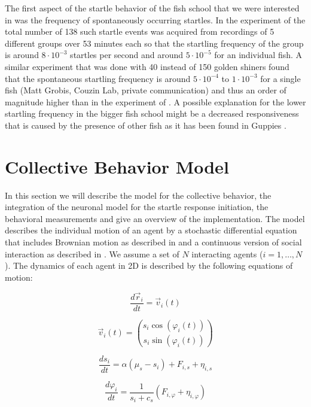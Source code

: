     The first aspect of the startle behavior of the fish school that we were interested in was the frequency of spontaneously occurring startles.
    In the experiment of \cite{Rosenthal2015} the total number of 138 such startle events was acquired from recordings of 5 different groups over 53 minutes each so that the startling frequency of the group is around $8\cdot 10^{-3}$ startles per second and around $5\cdot 10^{-5}$ for an individual fish.
    A similar experiment that was done with 40 instead of 150 golden shiners found that the spontaneous startling frequency is around $5\cdot 10^{-4}$ to $1\cdot 10^{-3}$ for a single fish (Matt Grobis, Couzin Lab, private communication) and thus an order of magnitude higher than in the experiment of \cite{Rosenthal2015}.
    A possible explanation for the lower startling frequency in the bigger fish school might be a decreased responsiveness that is caused by the presence of other fish as it has been found in Guppies \citep{Fischer2015}.
    \section{Collective Behavior Model}\label{swarm_methods}
    In this section we will describe the model for the collective behavior, the integration of the neuronal model for the startle response initiation, the behavioral measurements and give an overview of the implementation.
	The model describes the individual motion of an agent by a stochastic differential equation that includes Brownian motion as described in \cite{Romanczuk2012a} and a continuous version of social interaction as described in \cite{Couzin2002}.
	We assume a set of $N$ interacting agents ($i= 1,\dots, N$).
	The dynamics of each agent in 2D is described by the following equations of motion:

	\begin{equation}
		\frac{d \vec{r}_i}{dt}=\vec{v}_i(t)
		\label{eq:r_diff}
	\end{equation}
	
	\begin{equation}
		\vec{v}_i(t) = {s_i\cos(\varphi_i(t)) \choose s_i\sin(\varphi_i(t)) }
		\label{eq:v_def}
	\end{equation}
	
	\begin{equation}
		\frac{d s_i}{dt} = \alpha\left( \mu_{s} - s_i\right) + F_{i, s} + \eta_{i, s}
		\label{eq:s_diff}
	\end{equation}
	
	\begin{equation}
		\frac{d \varphi_i}{dt} = \frac{1}{s_i + c_{s}}\left( F_{i,\varphi} + \eta_{i,\varphi} \right)
		\label{eq:phi_diff}
	\end{equation}
	
